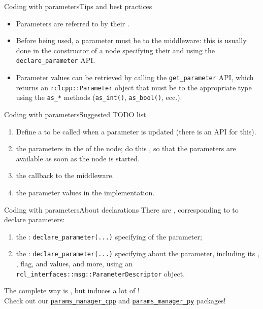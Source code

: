 \begin{frame}{Coding with parameters}{Tips and best practices}
  \justifying
	\begin{itemize}
		\item Parameters are referred to by their .
		\item Before being used, a parameter must be  to the middleware: this is usually done in the constructor of a node specifying their  and  using the \texttt{declare\_parameter} API.
		\item Parameter values can be retrieved  by calling the \texttt{get\_parameter} API, which returns an \texttt{rclcpp::Parameter} object that must be  to the appropriate type using the \texttt{as\_*} methods (\texttt{as\_int()}, \texttt{as\_bool()}, ecc.).
	\end{itemize}
\end{frame}
\begin{frame}{Coding with parameters}{Suggested TODO list}
  \begin{enumerate}
    \item Define a  to be called when a parameter is updated (there is an API for this).
    \item {} the parameters in the  of the node; do this , so that the parameters are available as soon as the node is started.
    \item {} the callback to the middleware.
    \item {} the parameter values in the implementation.
  \end{enumerate}
\end{frame}
\begin{frame}{Coding with parameters}{About declarations}
  \justifying
  There are , corresponding to  to declare parameters:
  \begin{enumerate}
    \item the : \texttt{declare\_parameter(...)} specifying  of the parameter;
    \item the : \texttt{declare\_parameter(...)} specifying  about the parameter, including its , ,  flag,  and  values,  and more, using an \texttt{rcl\_interfaces::msg::ParameterDescriptor} object.
  \end{enumerate}
  \begin{alertblock}{}
    \centering
    The complete way is , but induces a lot of !\\
    Check out our \href{https://github.com/dotX-Automation/params_manager_cpp}{\color{blue}\underline{\texttt{params\_manager\_cpp}}} and \href{https://github.com/dotX-Automation/params_manager_py}{\color{blue}\underline{\texttt{params\_manager\_py}}} packages!
  \end{alertblock}
\end{frame}

